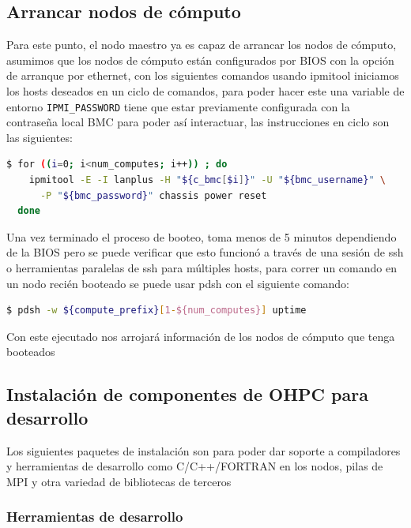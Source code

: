 \subsection{Arrancar nodos de cómputo}
Para este punto, el nodo maestro ya es capaz de arrancar los nodos de cómputo, asumimos que los nodos de cómputo están configurados por BIOS con la opción de arranque por ethernet, con los siguientes comandos usando ipmitool iniciamos los hosts deseados en un ciclo de comandos, para poder hacer este una variable de entorno \texttt{IPMI\_PASSWORD} tiene que estar previamente configurada con la contraseña local BMC para poder así interactuar, las instrucciones en ciclo son las siguientes:

\begin{lstlisting}[language=bash, caption={Ciclo de comandos para arrancar los nodos de cómputo}]
$ for ((i=0; i<num_computes; i++)) ; do
    ipmitool -E -I lanplus -H "${c_bmc[$i]}" -U "${bmc_username}" \
      -P "${bmc_password}" chassis power reset
  done
\end{lstlisting}

Una vez terminado el proceso de booteo, toma menos de 5 minutos dependiendo de la BIOS pero se puede verificar que esto funcionó a través de una sesión de ssh o herramientas paralelas de ssh para múltiples hosts, para correr un comando en un nodo recién booteado se puede usar pdsh con el siguiente comando:

\begin{lstlisting}[language=bash, caption={Comando para probar un nodo recién booteado}]
$ pdsh -w ${compute_prefix}[1-${num_computes}] uptime  
\end{lstlisting}

Con este ejecutado nos arrojará información de los nodos de cómputo que tenga booteados

\subsection{Instalación de componentes de OHPC para desarrollo}

Los siguientes paquetes de instalación son para poder dar soporte a compiladores y herramientas de desarrollo como C/C++/FORTRAN en los nodos, pilas de MPI y otra variedad de bibliotecas de terceros

\subsubsection{Herramientas de desarrollo}

